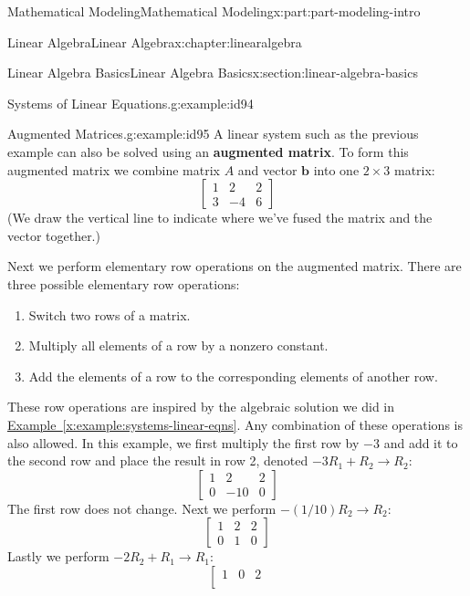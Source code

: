 \documentclass[oneside,10pt,]{book}
\newcommand{\xreffont}{\relax}
\newcommand{\terminology}[1]{\textbf{#1}}
\numberwithin{equation}{section}
\begin{document}
\begin{partptx}{Mathematical Modeling}{}{Mathematical Modeling}{}{}{x:part:part-modeling-intro}
\begin{chapterptx}{Linear Algebra}{}{Linear Algebra}{}{}{x:chapter:linearalgebra}
\begin{sectionptx}{Linear Algebra Basics}{}{Linear Algebra Basics}{}{}{x:section:linear-algebra-basics}
\begin{example}{Systems of Linear Equations.}{g:example:id94}
\end{example}
\begin{example}{Augmented Matrices.}{g:example:id95}%
A linear system such as the previous example can also be solved using an \terminology{augmented matrix}. To form this augmented matrix we combine matrix \(A\) and vector \(\mathbf{b}\) into one \(2\times 3\) matrix:%
%
\begin{equation*}
\left[ \begin{array}{cc|c}
1 & 2 & 2 \\
3 & -4 & 6
\end{array} \right]
\end{equation*}
(We draw the vertical line to indicate where we've fused the matrix and the vector together.)%
\par
Next we perform elementary row operations on the augmented matrix. There are three possible elementary row operations:%
%
\begin{enumerate}
\item{}Switch two rows of a matrix.%
\item{}Multiply all elements of a row by a nonzero constant.%
\item{}Add the elements of a row to the corresponding elements of another row.%
\end{enumerate}
These row operations are inspired by the algebraic solution we did in \hyperref[x:example:systems-linear-eqns]{Example~{\xreffont\ref{x:example:systems-linear-eqns}}}. Any combination of these operations is also allowed. In this example, we first multiply the first row by \(-3\) and add it to the second row and place the result in row 2, denoted \(-3R_1 + R_2 \to R_2\):%
%
\begin{equation*}
\left[ \begin{array}{cc|c}
1 & 2 & 2 \\
0 & -10 & 0
\end{array} \right]
\end{equation*}
The first row does not change. Next we perform \(-(1/10)R_2 \to R_2\):%
%
\begin{equation*}
\left[ \begin{array}{cc|c}
1 & 2 & 2 \\
0 & 1 & 0
\end{array} \right]
\end{equation*}
Lastly we perform \(-2R_2 + R_1 \to R_1\):%
%
\begin{equation*}
\left[ \begin{array}{cc|c}
1 & 0 & 2 \\

\end{array}
\end{equation*}
\end{example}
\end{sectionptx}
\end{chapterptx}
\end{partptx}
\end{document}
